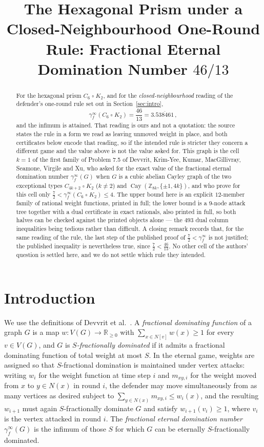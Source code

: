 \documentclass[11pt]{amsart}
\title[The hexagonal prism under a closed-neighbourhood rule]
{The Hexagonal Prism under a Closed-Neighbourhood One-Round Rule:
 Fractional Eternal Domination Number $46/13$}
\date{}
\theoremstyle{remark}
\newcommand{\fed}{\gamma_f^{\infty}}
\newcommand{\Z}{\mathbb{Z}}
\newcommand{\Cay}{\operatorname{Cay}}
\begin{document}
\begin{abstract}
For the hexagonal prism $C_6\mathbin{\square}K_2$, and for the
\emph{closed-neighbourhood} reading of the defender's one-round rule set out in
Section~\ref{sec:intro},
\[
  \fed(C_6\mathbin{\square}K_2)=\frac{46}{13}=3.\overline{538461}\,,
\]
and the infimum is attained. That reading is ours and not a quotation: the
source states the rule in a form we read as leaving unmoved weight in place, and
both certificates below encode that reading, so if the intended rule is stricter
they concern a different game and the value above is not the value asked for.
This graph is the cell $k=1$ of the first family of Problem 7.5 of Devvrit,
Krim-Yee, Kumar, MacGillivray, Seamone, Virgile and Xu, who asked for the exact
value of the fractional eternal domination number $\fed(G)$ when $G$ is a cubic
abelian Cayley graph of the two exceptional types $C_{4k+2}\mathbin{\square}K_2$
($k\ne2$) and $\Cay(\Z_{8k},\{\pm1,4k\})$, and who prove for this cell only
$\tfrac72<\fed(C_6\mathbin{\square}K_2)\le 4$. The upper bound here is an
explicit $12$-member family of rational weight functions, printed in full; the
lower bound is a $9$-node attack tree together with a dual certificate in exact
rationals, also printed in full, so both halves can be checked against the
printed objects alone --- the $493$ dual column inequalities being tedious
rather than difficult. A closing remark records that, for the same reading of
the rule, the last step of the published proof of $\tfrac72<\fed$ is not
justified; the published inequality is nevertheless true, since
$\tfrac72<\tfrac{46}{13}$. No other cell of the
authors' question is settled here, and we do not settle which rule they
intended.
\end{abstract}

\maketitle

\section{Introduction}\label{sec:intro}

We use the definitions of Devvrit et al.\ \cite{FED}. A
\emph{fractional dominating function} of a graph $G$ is a map
$w\colon V(G)\to\mathbb{R}_{\ge0}$ with $\sum_{x\in N[v]}w(x)\ge1$ for every
$v\in V(G)$, and $G$ is \emph{$S$-fractionally dominated} if it admits a
fractional dominating function of total weight at most $S$. In the eternal
game, weights are assigned so that $S$-fractional domination is maintained
under vertex attacks: writing $w_i$ for the weight function at time step $i$
and $m_{xy,i}$ for the weight moved from $x$ to $y\in N(x)$ in round $i$, the
defender may move simultaneously from as many vertices as desired subject to
$\sum_{y\in N(x)}m_{xy,i}\le w_i(x)$, and the resulting $w_{i+1}$ must again
$S$-fractionally dominate $G$ and satisfy $w_{i+1}(v_i)\ge1$, where $v_i$ is
the vertex attacked in round $i$. The \emph{fractional eternal domination
number} $\fed(G)$ is the infimum of those $S$ for which $G$ can be eternally
$S$-fractionally dominated.
\end{document}
